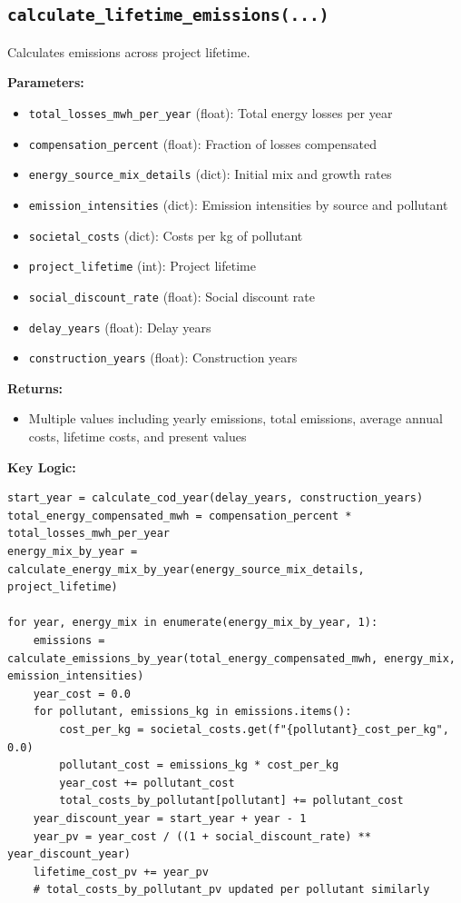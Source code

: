 \documentclass[ctcc_full_documentation.tex]{subfiles}
\begin{document}
\subsection{\texttt{calculate\_lifetime\_emissions(...)}}

Calculates emissions across project lifetime.

\textbf{Parameters:}
\begin{itemize}
    \item \texttt{total\_losses\_mwh\_per\_year} (float): Total energy losses per year
    \item \texttt{compensation\_percent} (float): Fraction of losses compensated
    \item \texttt{energy\_source\_mix\_details} (dict): Initial mix and growth rates
    \item \texttt{emission\_intensities} (dict): Emission intensities by source and pollutant
    \item \texttt{societal\_costs} (dict): Costs per kg of pollutant
    \item \texttt{project\_lifetime} (int): Project lifetime
    \item \texttt{social\_discount\_rate} (float): Social discount rate
    \item \texttt{delay\_years} (float): Delay years
    \item \texttt{construction\_years} (float): Construction years
\end{itemize}

\textbf{Returns:}
\begin{itemize}
    \item Multiple values including yearly emissions, total emissions, average annual costs, lifetime costs, and present values
\end{itemize}

\textbf{Key Logic:}
\begin{lstlisting}
start_year = calculate_cod_year(delay_years, construction_years)
total_energy_compensated_mwh = compensation_percent * total_losses_mwh_per_year
energy_mix_by_year = calculate_energy_mix_by_year(energy_source_mix_details, project_lifetime)

for year, energy_mix in enumerate(energy_mix_by_year, 1):
    emissions = calculate_emissions_by_year(total_energy_compensated_mwh, energy_mix, emission_intensities)
    year_cost = 0.0
    for pollutant, emissions_kg in emissions.items():
        cost_per_kg = societal_costs.get(f"{pollutant}_cost_per_kg", 0.0)
        pollutant_cost = emissions_kg * cost_per_kg
        year_cost += pollutant_cost
        total_costs_by_pollutant[pollutant] += pollutant_cost
    year_discount_year = start_year + year - 1
    year_pv = year_cost / ((1 + social_discount_rate) ** year_discount_year)
    lifetime_cost_pv += year_pv
    # total_costs_by_pollutant_pv updated per pollutant similarly
\end{lstlisting}
\end{document}
